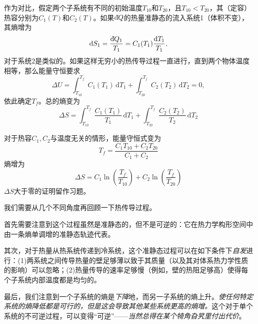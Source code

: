 作为对比，假定两个子系统有不同的初始温度$T_{10}$和$T_{20}$，且$T_{10}<T_{20}$，其（定容）热容分别为$C_1(T)$和$C_2(T)$。如果$\mathrm d\hspace*{-0.1em}\bar{}\hspace*{0.08em} Q$的热量准静态的流入系统1（体积不变），其熵增为
\begin{equation}
\mathrm dS_1 = \frac{\mathrm d\hspace*{-0.1em}\bar{}\hspace*{0.08em} Q_1}{T_1} = C_1(T_1)\frac{\mathrm dT_1}{T_1},
\end{equation}
对于系统2是类似的。如果这样无穷小的热传导过程一直进行，直到两个物体温度相等，那么能量守恒要求
\begin{equation}
\Delta U = \int_{T_{10}}^{T_f} C_1(T_1)\,\mathrm dT_1 + \int_{T_{20}}^{T_f}C_2(T_2)\,\mathrm dT_2 = 0,
\end{equation}
依此确定$T_f$。总的熵变为
\begin{equation}
\Delta S = \int_{T_{10}}^{T_f} \frac{C_1(T_1)}{T_1}\,\mathrm dT_1 + \int_{T_{20}}^{T_f}\frac{C_2(T_2)}{T_2}\,\mathrm dT_2
\end{equation}

对于热容$C_1,C_2$与温度无关的情形，能量守恒式变为
\begin{equation}
T_f = \frac{C_1T_{10}+C_2T_{20}}{C_1+C_2}
\end{equation}
熵增为
\begin{equation}
\Delta S = C_1\ln\left(\frac{T_f}{T_{10}}\right) + C_2\ln\left(\frac{T_f}{T_{20}}\right)
\label{equ4.5}
\end{equation}
$\Delta S$大于零的证明留作习题。

我们需要从几个不同角度再回顾一下热传导过程。

首先需要注意到这个过程虽然是准静态的，但不是可逆的：它在热力学构形空间中由一条熵单调增的准静态轨迹代表。

其次，对于热量从热系统传递到冷系统，这个准静态过程可以在如下条件下{\it 自发}进行：(1)两系统之间传导热量的壁足够薄以致于其质量（以及其对体系热力学性质的影响）可以忽略；(2)热量传导的速率足够慢（例如，壁的热阻足够高）使得每个子系统内部温度都是均匀的。

最后，我们注意到一个子系统的熵是{\it 下降}地，而另一子系统的熵上升。{\it 使任何特定系统的熵降低都是可行的，但是这会导致其他某些系统更高的熵增。}这个对于单个系统的不可逆过程，可以变得“可逆”——{\it 当然总得在某个犄角旮旯里付出代价}。

